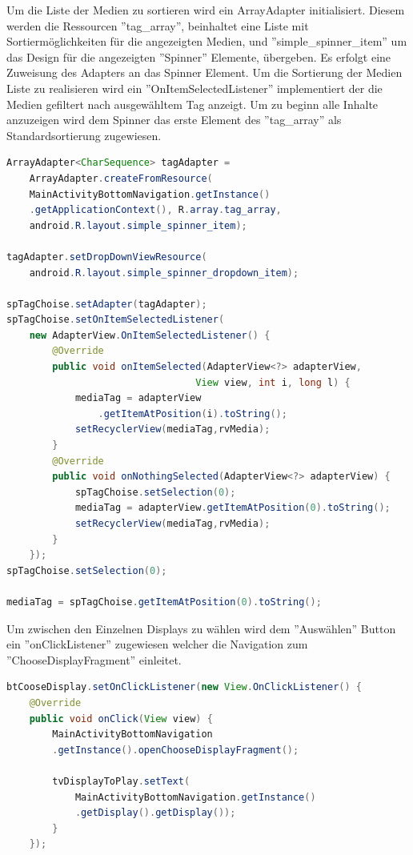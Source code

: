 Um die Liste der Medien zu sortieren wird ein ArrayAdapter initialisiert. Diesem werden die Ressourcen ''tag\_array'', beinhaltet eine Liste mit Sortiermöglichkeiten für die angezeigten Medien, und ''simple\_spinner\_item'' um das Design für die angezeigten ''Spinner'' Elemente, übergeben. Es erfolgt eine Zuweisung des Adapters an das Spinner Element. Um die Sortierung der Medien Liste zu realisieren wird ein ''OnItemSelectedListener'' implementiert der die Medien gefiltert nach ausgewähltem Tag anzeigt. Um zu beginn alle Inhalte anzuzeigen wird dem Spinner das erste Element des ''tag\_array'' als Standardsortierung zugewiesen.
\begin{lstlisting}[language=Java,caption={Erstellen des Spinner und der dazugehörigen Event-Listener MediaOverviewFragment}]
ArrayAdapter<CharSequence> tagAdapter =
	ArrayAdapter.createFromResource(
    MainActivityBottomNavigation.getInstance()
    .getApplicationContext(), R.array.tag_array,
    android.R.layout.simple_spinner_item);
        
tagAdapter.setDropDownViewResource(
	android.R.layout.simple_spinner_dropdown_item);
    	
spTagChoise.setAdapter(tagAdapter);
spTagChoise.setOnItemSelectedListener(
	new AdapterView.OnItemSelectedListener() {
        @Override
        public void onItemSelected(AdapterView<?> adapterView,
        						 View view, int i, long l) {
            mediaTag = adapterView
            	.getItemAtPosition(i).toString();
            setRecyclerView(mediaTag,rvMedia);
        }
        @Override
        public void onNothingSelected(AdapterView<?> adapterView) {
            spTagChoise.setSelection(0);
            mediaTag = adapterView.getItemAtPosition(0).toString();
            setRecyclerView(mediaTag,rvMedia);
        }
    });
spTagChoise.setSelection(0);

mediaTag = spTagChoise.getItemAtPosition(0).toString();
\end{lstlisting}
Um zwischen den Einzelnen Displays zu wählen wird dem ''Auswählen'' Button ein ''onClickListener'' zugewiesen welcher die Navigation zum ''ChooseDisplayFragment'' einleitet.

\begin{lstlisting}[language=Java,caption={OnClickListener für Displayauswahl im MediaOverviewFragment}]
btCooseDisplay.setOnClickListener(new View.OnClickListener() {
   	@Override
    public void onClick(View view) {
    	MainActivityBottomNavigation
    	.getInstance().openChooseDisplayFragment();
      	
        tvDisplayToPlay.setText(
        	MainActivityBottomNavigation.getInstance()
        	.getDisplay().getDisplay());
        }
    });
\end{lstlisting}

